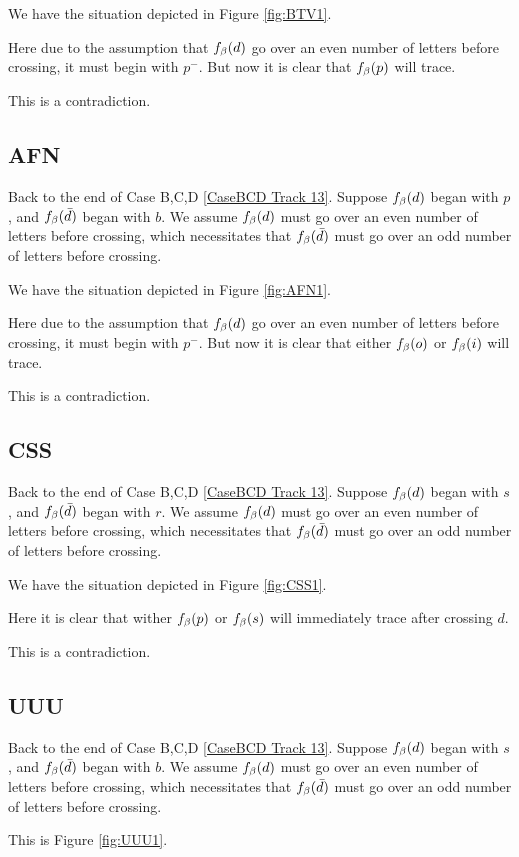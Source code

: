 We have the situation depicted in Figure \ref{fig:BTV1}.

Here due to the assumption that $f_\beta(d)$ go over an even number of letters before crossing, it must begin with $p^-$. But now it is clear that $f_\beta(p)$ will trace.

This is a contradiction.

\subsection{AFN}\label{AFN}
Back to the end of Case B,C,D \ref{CaseBCD Track 13}.
Suppose $f_\beta(d)$ began with $p$, and $f_\beta(\bar{d})$ began with $b$. We assume $f_\beta(d)$ must go over an even number of letters before crossing, which necessitates that $f_\beta(\bar{d})$ must go over an odd number of letters before crossing.

We have the situation depicted in Figure \ref{fig:AFN1}.

Here due to the assumption that $f_\beta(d)$ go over an even number of letters before crossing, it must begin with $p^-$. But now it is clear that either $f_\beta(o)$ or $f_\beta(i)$ will trace.

This is a contradiction.

\subsection{CSS}\label{CSS}
Back to the end of Case B,C,D \ref{CaseBCD Track 13}.
Suppose $f_\beta(d)$ began with $s$, and $f_\beta(\bar{d})$ began with $r$. We assume $f_\beta(d)$ must go over an even number of letters before crossing, which necessitates that $f_\beta(\bar{d})$ must go over an odd number of letters before crossing.

We have the situation depicted in Figure \ref{fig:CSS1}.

Here it is clear that wither $f_\beta(p)$ or $f_\beta(s)$ will immediately trace after crossing $d$.

This is a contradiction.

\subsection{UUU}\label{UUU}
Back to the end of Case B,C,D \ref{CaseBCD Track 13}.
Suppose $f_\beta(d)$ began with $s$, and $f_\beta(\bar{d})$ began with $b$. We assume $f_\beta(d)$ must go over an even number of letters before crossing, which necessitates that $f_\beta(\bar{d})$ must go over an odd number of letters before crossing.

This is Figure \ref{fig:UUU1}.

